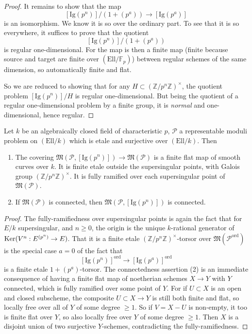 \begin{proof}
It remains to show that the map
\[
[\mathrm{Ig}(p^n)]/(1 + (p^a)) \to [\mathrm{Ig}(p^a)]
\]
is an isomorphism. We know it is so over the ordinary part. To see that it is so everywhere, it suffices to prove that the quotient
\[
[\mathrm{Ig}(p^n)]/(1 + (p^a))
\]
is regular one-dimensional. For the map is then a finite map (finite because source and target are finite over $(\mathrm{Ell}/\mathbb{F}_p)$) between regular schemes of the same dimension, so automatically finite and flat.

So we are reduced to showing that for any $H \subset (\mathbb{Z}/p^n\mathbb{Z})^\times$, the quotient problem $[\mathrm{Ig}(p^n)]/H$ is regular one-dimensional. But being the quotient of a regular one-dimensional problem by a finite group, it is \emph{normal} and one-dimensional, hence regular.
\end{proof}

\begin{kcor}[Igusa]\label{cor:12.6.2}
Let $k$ be an algebraically closed field of characteristic $p$, $\mathcal{P}$ a representable moduli problem on $(\mathrm{Ell}/k)$ which is etale and surjective over $(\mathrm{Ell}/k)$. Then
\begin{enumerate}[label=(\arabic*)]
\item The covering $\mathfrak{M}(\mathcal{P}, [\mathrm{Ig}(p^n)]) \to \mathfrak{M}(\mathcal{P})$ is a finite flat map of smooth curves over $k$. It is finite etale outside the supersingular points, with Galois group $(\mathbb{Z}/p^n\mathbb{Z})^\times$. It is fully ramified over each supersingular point of $\mathfrak{M}(\mathcal{P})$.
\item If $\mathfrak{M}(\mathcal{P})$ is connected, then $\mathfrak{M}(\mathcal{P}, [\mathrm{Ig}(p^n)])$ is connected.
\end{enumerate}
\end{kcor}

\begin{proof}
The fully-ramifiedness over supersingular points is again the fact that for $E/k$ supersingular, and $n \ge 0$, the origin is the unique $k$-rational generator of $\operatorname{Ker}(V^n : E^{(p^n)} \to E)$. That it is a finite etale $(\mathbb{Z}/p^n\mathbb{Z})^\times$-torsor over $\mathfrak{M}(\mathcal{P}^{\mathrm{ord}})$ is the special case $a = 0$ of the fact that
\[
[\mathrm{Ig}(p^n)]^{\mathrm{ord}} \to [\mathrm{Ig}(p^a)]^{\mathrm{ord}}
\]
is a finite etale $1 + (p^a)$-torsor. The connectedness assertion (2) is an immediate consequence of having a finite flat map of noetherian schemes $X \to Y$ with $Y$ connected, which is fully ramified over some point of $Y$. For if $U \subset X$ is an open and closed subscheme, the composite $U \subset X \to Y$ is still both finite and flat, so locally free over all of $Y$ of some degree $\ge 1$. So if $V = X - U$ is non-empty, it too is finite flat over $Y$, so also locally free over $Y$ of some degree $\ge 1$. Then $X$ is a disjoint union of two surjective $Y$-schemes, contradicting the fully-ramifiedness.
\end{proof}

